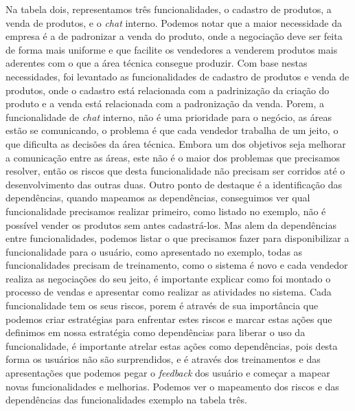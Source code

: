       Na tabela dois, representamos três funcionalidades, o cadastro de produtos,
      a venda de produtos, e o \textit{chat} interno. Podemos notar que a maior necessidade
      da empresa é a de padronizar a venda do produto, onde a negociação deve ser
      feita de forma mais uniforme e que facilite os vendedores a venderem produtos
      mais aderentes com o que a área técnica consegue produzir. Com base nestas
      necessidades, foi levantado as funcionalidades de cadastro de produtos e
      venda de produtos, onde o cadastro está relacionada com a padrinização da
      criação do produto e a venda está relacionada com a padronização da venda.
      Porem, a funcionalidade de \textit{chat} interno, não é uma prioridade para
      o negócio, as áreas estão se comunicando, o problema é que cada vendedor
      trabalha de um jeito, o que dificulta as decisões da área técnica. Embora um
      dos objetivos seja melhorar a comunicação entre as áreas, este não é o maior
      dos problemas que precisamos resolver, então os riscos que desta funcionalidade
      não precisam ser corridos até o desenvolvimento das outras duas. \newline
      Outro ponto de destaque é a identificação das dependências, quando mapeamos
      as dependências, conseguimos ver qual funcionalidade precisamos realizar
      primeiro, como listado no exemplo, não é possível vender os produtos sem antes
      cadastrá-los. Mas alem da dependências entre funcionalidades, podemos listar
      o que precisamos fazer para disponibilizar a funcionalidade para o usuário,
      como apresentado no exemplo, todas as funcionalidades precisam de treinamento,
      como o sistema é novo e cada vendedor realiza as negociações do seu jeito,
      é importante explicar como foi montado o processo de vendas e apresentar
      como realizar as atividades no sistema. \newline
      Cada funcionalidade tem os seus riscos, porem é através de sua importância que
      podemos criar estratégias para enfrentar estes riscos e marcar estas ações
      que definimos em nossa estratégia como dependências para liberar o uso da
      funcionalidade, é importante atrelar estas ações como dependências, pois desta
      forma os usuários não são surprendidos, e é através dos treinamentos e das
      apresentações que podemos pegar o \textit{feedback} dos usuário e começar a
      mapear novas funcionalidades e melhorias. Podemos ver o mapeamento dos riscos
      e das dependências das funcionalidades exemplo na tabela três.\newline

